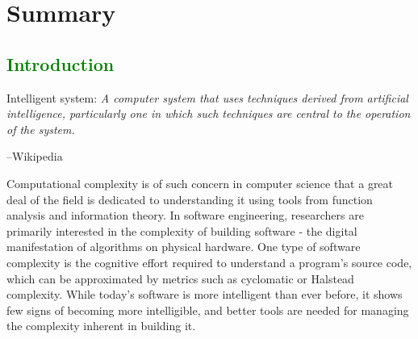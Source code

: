 \documentclass[12pt,initial,twoside,maitrise]{dms}
\newcommand{\mediumwell}[1]{\textcolor{green}{#1}}
\numberwithin{equation}{section}
\numberwithin{table}{chapter}
\numberwithin{figure}{chapter}
\begin{document}

\chapter*{Summary}


\anglais
\cleardoublepage
{}  %
\tableofcontents
\cleardoublepage
{}  %
\listoftables
\cleardoublepage
{}
\listoffigures

\NoChapterPageNumber
\cleardoublepage
{}

\mediumwell{\chapter{Introduction}\label{ch:introduction}}

\setlength{\epigraphwidth}{0.9\textwidth}
\epigraph{Intelligent system: \textit{A computer system that uses techniques derived from artificial intelligence, particularly one in which such techniques are central to the operation of the system.}}{\begin{flushright}--Wikipedia\end{flushright}}

Computational complexity is of such concern in computer science that a great deal of the field is dedicated to understanding it using tools from function analysis and information theory. In software engineering, researchers are primarily interested in the complexity of building software - the digital manifestation of algorithms on physical hardware. One type of software complexity is the cognitive effort required to understand a program’s source code, which can be approximated by metrics such as cyclomatic or Halstead complexity.  While today’s software is more intelligent than ever before, it shows few signs of becoming more intelligible, and better tools are needed for managing the complexity inherent in building it.
\end{document}
